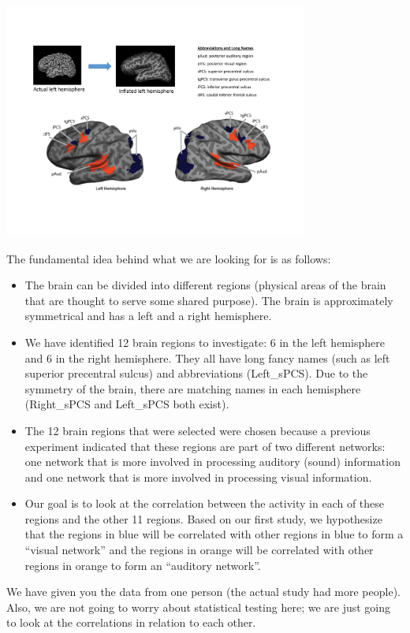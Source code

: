 \begin{center}
\includegraphics[width=0.75\textwidth]{FacesDay4/figs/brainimages.pdf}
\end{center}

The fundamental idea behind what we are looking for is as follows:
\begin{itemize}
\item The brain can be divided into different regions (physical areas of the brain that are thought to serve some shared purpose). The brain is approximately symmetrical and has a left and a right hemisphere.
\item We have identified 12 brain regions to investigate: 6 in the left hemisphere and 6 in the right hemisphere. They all have long fancy names (such as left superior precentral sulcus) and abbreviations (Left\_sPCS). Due to the symmetry of the brain, there are matching names in each hemisphere (Right\_sPCS and Left\_sPCS both exist).
\item The 12 brain regions that were selected were chosen because a previous experiment indicated that these regions are part of two different networks: one network that is more involved in processing auditory (sound) information and one network that is more involved in processing visual information.
\item Our goal is to look at the correlation between the activity in each of these regions and the other 11 regions. Based on our first study, we hypothesize that the regions in blue will be correlated with other regions in blue to form a ``visual network'' and the regions in orange will be correlated with other regions in orange to form an ``auditory network''.
\end{itemize}
We have given you the data from one person (the actual study had more people). Also, we are not going to worry about statistical testing here; we are just going to look at the correlations in relation to each other.

